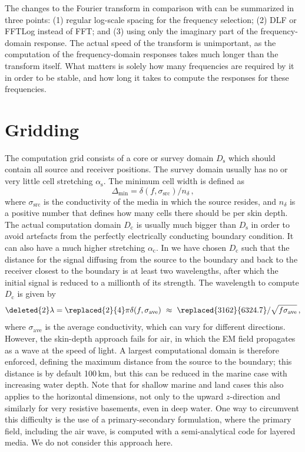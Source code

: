 \documentclass[extra, camera,%
    referee,     %
]{gji}
\newcommand{\mr}[1]{\mathrm{#1}}
\begin{document}
The changes to the Fourier transform in comparison with \cite{GEO.08.Mulder}
can be summarized in three points: (1) regular log-scale spacing for the
frequency selection; (2) DLF or FFTLog instead of FFT; and (3) using only the
imaginary part of the frequency-domain response. The actual speed of the
transform is unimportant, as the computation of the frequency-domain responses
takes much longer than the transform itself. What matters is solely how many
frequencies are required by it in order to be stable, and how long it takes to
compute the responses for these frequencies.

\section{Gridding}  %

The computation grid consists of a core or survey domain $D_\mr{s}$ which
should contain all source and receiver positions. The survey domain usually has
no or very little cell stretching $\alpha_\mr{s}$. The minimum cell width is
defined as
%
\begin{equation}
  \Delta_\mr{min}=\delta(f, \sigma_\mr{src})/n_\delta \, ,
  \label{eq:minwidth}
\end{equation}
%
where $\sigma_\mr{src}$ is the conductivity of the media in which the source
resides, and $n_\delta$ is a positive number that defines how many cells there
should be per skin depth. The actual computation domain $D_\mr{c}$ is usually
much bigger than $D_\mr{s}$ in order to avoid artefacts from the perfectly
electrically conducting boundary condition. It can also have a much higher
stretching $\alpha_\mr{c}$. In  we
have chosen $D_\mr{c}$ such that the distance for the signal diffusing from the
source to the boundary and back to the receiver closest to the boundary is at
least two wavelengths, after which the initial signal is reduced to a millionth
of its strength. The wavelength \added{$\lambda$} to compute $D_\mr{c}$ is
given by
%
\begin{equation}
  \deleted{2}\lambda = \replaced{2}{4}\pi\delta(f, \sigma_\mr{ave})
  \ \approx \ \replaced{3162}{6324.7}/\sqrt{f\sigma_\mr{ave}}\, ,
 \label{eq:lambda}
\end{equation}
%
where $\sigma_\mr{ave}$ is the average conductivity, which can vary for
different directions. However, the skin-depth approach fails for air, in which
the EM field propagates as a wave at the speed of light. A largest
computational domain is therefore enforced, defining the maximum distance from
the source to the boundary; this distance is by default 100\,km, but this can
be reduced in the marine case with increasing water depth. Note that for
shallow marine and land cases this also applies to the horizontal dimensions,
not only to the upward $z$-direction and similarly for very resistive
basements, even in deep water. One way to circumvent this difficulty is the use
of a primary-secondary formulation, where the primary field, including the air
wave, is computed with a semi-analytical code for layered media. We do not
consider this approach here.
\end{document}
